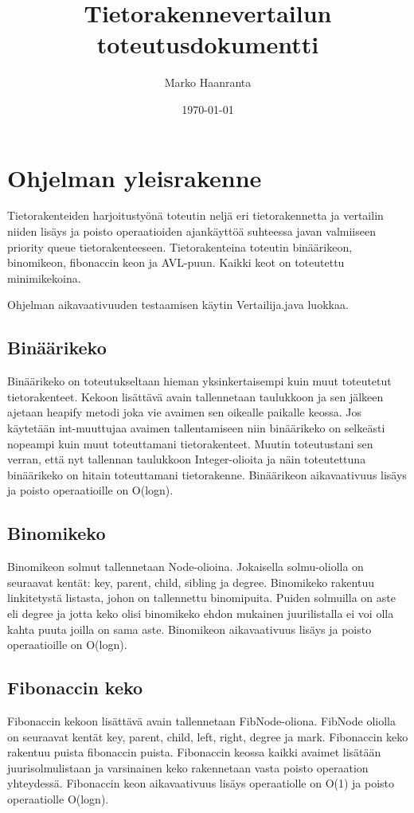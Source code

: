 \documentclass[11pt,a4paper]{article}
\author{Marko Haanranta}
\date{\today}
\title{Tietorakennevertailun toteutusdokumentti}
\begin{document}
\maketitle
\section{Ohjelman yleisrakenne}
Tietorakenteiden harjoitustyönä toteutin neljä eri tietorakennetta ja vertailin niiden lisäys ja poisto operaatioiden ajankäyttöä suhteessa javan valmiiseen priority queue tietorakenteeseen. Tietorakenteina toteutin binäärikeon, binomikeon, fibonaccin keon ja AVL-puun. Kaikki keot on toteutettu minimikekoina. 

Ohjelman aikavaativuuden testaamisen käytin Vertailija.java luokkaa.
\subsection{Binäärikeko}
Binäärikeko on toteutukseltaan hieman yksinkertaisempi kuin muut toteutetut tietorakenteet. Kekoon lisättävä avain tallennetaan taulukkoon ja sen jälkeen ajetaan heapify metodi joka vie avaimen sen oikealle paikalle keossa. Jos käytetään int-muuttujaa avaimen tallentamiseen niin binäärikeko on selkeästi nopeampi kuin muut toteuttamani tietorakenteet. Muutin toteutustani sen verran, että nyt tallennan taulukkoon Integer-olioita ja näin toteutettuna binäärikeko on hitain toteuttamani tietorakenne. Binäärikeon aikavaativuus lisäys ja poisto operaatioille on O(logn)\cite{tira}.
\subsection{Binomikeko}
Binomikeon solmut tallennetaan Node-olioina. Jokaisella solmu-oliolla on seuraavat kentät: key, parent, child, sibling ja degree. Binomikeko rakentuu linkitetystä listasta, johon on tallennettu binomipuita. Puiden solmuilla on aste eli degree ja jotta keko olisi binomikeko ehdon mukainen juurilistalla ei voi olla kahta puuta joilla on sama aste. Binomikeon aikavaativuus lisäys ja poisto operaatioille on O(logn)\cite{tira}.
\subsection{Fibonaccin keko}
Fibonaccin kekoon lisättävä avain tallennetaan FibNode-oliona. FibNode oliolla on seuraavat kentät key, parent, child, left, right, degree ja mark\cite{cormen}. Fibonaccin keko rakentuu puista fibonaccin puista. Fibonaccin keossa kaikki avaimet lisätään juurisolmulistaan ja varsinainen keko rakennetaan vasta poisto operaation yhteydessä. Fibonaccin keon aikavaativuus lisäys operaatiolle on O(1) ja poisto operaatiolle O(logn)\cite{heap}.
\end{document}
